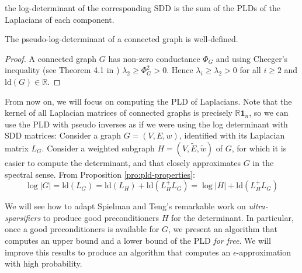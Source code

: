 the log-determinant of the corresponding SDD is the sum of the PLDs
of the Laplacians of each component. \begin{lemma} The pseudo-log-determinant
of a connected graph is well-defined.\end{lemma} \begin{proof} A
connected graph $G$ has non-zero conductance $\Phi_{G}$ and using
Cheeger's inequality (see Theorem 4.1 in \cite{Spielman2010a}) $\lambda_{2}\geq\Phi_{G}^{2}>0$.
Hence $\lambda_{i}\geq\lambda_{2}>0$ for all $i\geq2$ and $\text{ld}\left(G\right)\in\mathbb{R}$.
\end{proof} From now on, we will focus on computing the PLD of Laplacians.
Note that the kernel of all Laplacian matrices of connected graphs
is precisely $\mathbb{R}\mathbf{1}_{n}$, so we can use the PLD with
pseudo inverses as if we were using the log determinant with SDD matrices:
Consider a graph $G=\left(V,E,w\right)$, identified with its Laplacian
matrix $L_{G}$. Consider a weighted subgraph $H=\left(V,\tilde{E},\tilde{w}\right)$
of $G$, for which it is easier to compute the determinant, and that
closely approximates $G$ in the spectral sense. From Proposition
\ref{pro:pld-properties}: 
\[
\log\left|G\right|=\text{ld}\left(L_{G}\right)=\text{ld}\left(L_{H}\right)+\text{ld}\left(L_{H}^{+}L_{G}\right)=\log\left|H\right|+\text{ld}\left(L_{H}^{+}L_{G}\right)
\]


We will see how to adapt Spielman and Teng's remarkable work on \emph{ultra-sparsifiers}
to produce good preconditioners $H$ for the determinant. In particular,
once a good preconditioners is available for $G$, we present an algorithm
that computes an upper bound and a lower bound of the PLD \emph{for
free}. We will improve this results to produce an algorithm that computes
an $\epsilon$-approximation with high probability.
